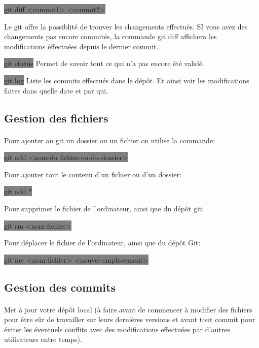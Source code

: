 \documentclass[11pt,a4paper,titlepage, oneside]{article}
\begin{document}
			\colorbox{gray}{git diff <commit1> <commit2>}

			Le git offre la possiblité de trouver les changements effectués. SI vous avez des changements pas encore commités, la commande git diff affichera les modifications éffectuées depuis le dernier commit.

			\colorbox{gray}{git status} Permet de savoir tout ce qui n'a pas encore été validé.
	
			\colorbox{gray}{git log} Liste les commits effectués dans le dépôt. Et ainsi voir les modifications faites dans quelle date et par qui.

	\subsection{{\color{blue} Gestion des fichiers}}

		\paragraph{}
			Pour ajouter au git un dossier ou un fichier on utilise la commande:

			\colorbox{gray}{git add <nom-du fichier-ou-du-dossier>}

			Pour ajouter tout le contenu d'un fichier ou d'un dossier:

			\colorbox{gray}{git add *}

			Pour supprimer le fichier de l'ordinateur, ainsi que du dépôt git:		
			
			\colorbox{gray}{git rm <nom-fichier>}

			Pour déplacer le fichier de l'ordinateur, ainsi que du dépôt Git:
			
			\colorbox{gray}{git mv <nom-fichier> <nouvel-emplacement>}

	\subsection{{\color{blue} Gestion des commits}}

		\paragraph{}
			Met à jour votre dépôt local (à faire avant de commencer à modifier des fichiers pour être sûr de travailler sur leurs dernières versions et avant tout commit pour éviter les éventuels conflits avec des modifications effectuées par d'autres utilisateurs entre temps). 
\end{document}
